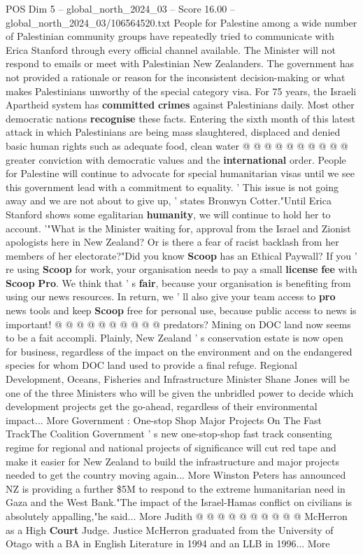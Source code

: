 \begin{textsample}{POS Dim 5 – global\_north\_2024\_03 – Score 16.00 – global\_north\_2024\_03/106564520.txt}
People for Palestine among a wide number of Palestinian community groups have repeatedly tried to communicate with Erica Stanford through every official channel available.
The Minister will not respond to emails or meet with Palestinian New Zealanders.
The government has not provided a rationale or reason for the inconsistent decision-making or what makes Palestinians unworthy of the special category visa.
For 75 years, the Israeli Apartheid system has \textbf{committed} \textbf{crimes} against Palestinians daily.
Most other democratic nations \textbf{recognise} these facts.
Entering the sixth month of this latest attack in which Palestinians are being mass slaughtered, displaced and denied basic human rights such as adequate food, clean water @ @ @ @ @ @ @ @ @ @ greater conviction with democratic values and the \textbf{international} order.
People for Palestine will continue to advocate for special humanitarian visas until we see this government lead with a commitment to equality. ' This issue is not going away and we are not about to give up, ' states Bronwyn Cotter."Until Erica Stanford shows some egalitarian \textbf{humanity}, we will continue to hold her to account. '"What is the Minister waiting for, approval from the Israel and Zionist apologists here in New Zealand?
Or is there a fear of racist backlash from her members of her electorate?"Did you know \textbf{Scoop} has an Ethical Paywall?
If you ' re using \textbf{Scoop} for work, your organisation needs to pay a small \textbf{license} \textbf{fee} with \textbf{Scoop} \textbf{Pro}.
We think that ' s \textbf{fair}, because your organisation is benefiting from using our news resources.
In return, we ' ll also give your team access to \textbf{pro} news tools and keep \textbf{Scoop} free for personal use, because public access to news is important! @ @ @ @ @ @ @ @ @ @ predators?
Mining on DOC land now seems to be a fait accompli.
Plainly, New Zealand ' s conservation estate is now open for business, regardless of the impact on the environment and on the endangered species for whom DOC land used to provide a final refuge.
Regional Development, Oceans, Fisheries and Infrastructure Minister Shane Jones will be one of the three Ministers who will be given the unbridled power to decide which development projects get the go-ahead, regardless of their environmental impact...
More Government : One-stop Shop Major Projects On The Fast TrackThe Coalition Government ' s new one-stop-shop fast track consenting regime for regional and national projects of significance will cut red tape and make it easier for New Zealand to build the infrastructure and major projects needed to get the country moving again...
More Winston Peters has announced NZ is providing a further \$5M to respond to the extreme humanitarian need in Gaza and the West Bank."The impact of the Israel-Hamas conflict on civilians is absolutely appalling,"he said...
More Judith @ @ @ @ @ @ @ @ @ @ McHerron as a High \textbf{Court} Judge.
Justice McHerron graduated from the University of Otago with a BA in English Literature in 1994 and an LLB in 1996...
More


\end{textsample}
